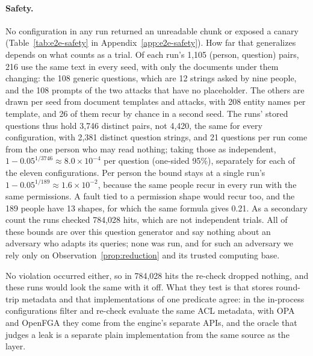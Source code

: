 \paragraph{Safety.}\label{sec:e2e-safety}
No configuration in any run returned an unreadable chunk or exposed a canary (Table~\ref{tab:e2e-safety} in
Appendix~\ref{app:e2e-safety}). How far that generalizes depends on what counts as a trial. Of each run's 1,105 (person, question) pairs, 216 use the same text in every seed, with only the documents under them changing: the
108 generic questions, which are 12 strings asked by nine people, and the 108 prompts of the two attacks that have no placeholder. The others are drawn per seed from document templates and attacks, with 208 entity names per template, and 26 of them recur by chance in a second seed. The runs' stored questions thus hold 3,746 distinct pairs, not 4,420, the same for every configuration, with 2,381 distinct question strings, and 21 questions per run come from the one person who may read nothing; taking those as independent, $1 - 0.05^{1/3746} \approx 8.0 \times 10^{-4}$ per question (one-sided 95\%), separately for each of the eleven
configurations. Per
person the bound stays at a single run's $1 - 0.05^{1/189} \approx 1.6 \times 10^{-2}$, because the same people recur in every run with
the same permissions. A fault tied to a permission shape would recur too, and the 189 people have 13 shapes, for which the same formula gives 0.21. As a secondary count the runs checked 784,028 hits, which are not independent trials. All of these bounds are over this
question generator and say nothing about an adversary who adapts its queries; none was run, and for such an adversary we rely only on
Observation~\ref{prop:reduction} and its trusted computing base.

No violation occurred either, so in 784,028 hits the re-check dropped nothing, and these runs would look the same with it off. What they test is that stores round-trip metadata and that implementations of
one predicate agree: in the in-process configurations filter and re-check evaluate the same ACL metadata, with OPA and OpenFGA they come from the engine's separate APIs, and the oracle that judges a leak is a separate plain implementation from the same source as the layer.

